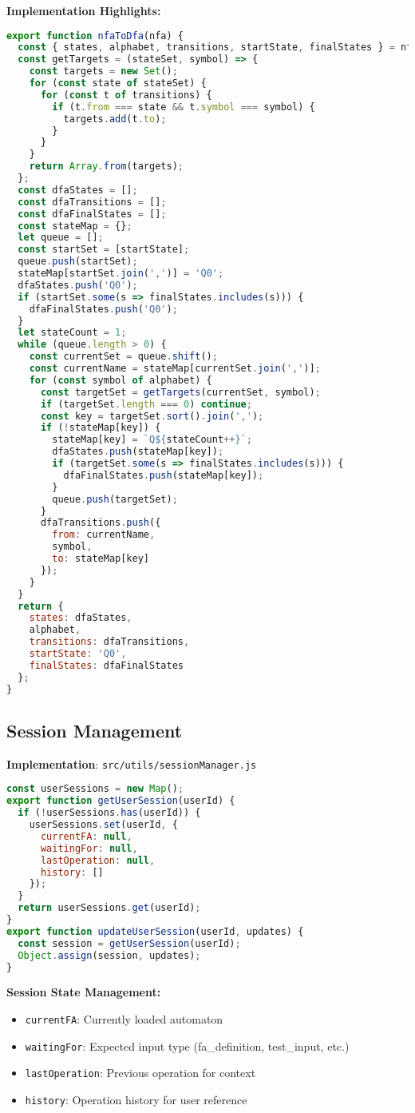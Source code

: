 \documentclass[12pt]{article}
\begin{document}
\textbf{Implementation Highlights:}
\begin{lstlisting}[language=JavaScript]
export function nfaToDfa(nfa) {
  const { states, alphabet, transitions, startState, finalStates } = nfa;
  const getTargets = (stateSet, symbol) => {
    const targets = new Set();
    for (const state of stateSet) {
      for (const t of transitions) {
        if (t.from === state && t.symbol === symbol) {
          targets.add(t.to);
        }
      }
    }
    return Array.from(targets);
  };
  const dfaStates = [];
  const dfaTransitions = [];
  const dfaFinalStates = [];
  const stateMap = {};
  let queue = [];
  const startSet = [startState];
  queue.push(startSet);
  stateMap[startSet.join(',')] = 'Q0';
  dfaStates.push('Q0');
  if (startSet.some(s => finalStates.includes(s))) {
    dfaFinalStates.push('Q0');
  }
  let stateCount = 1;
  while (queue.length > 0) {
    const currentSet = queue.shift();
    const currentName = stateMap[currentSet.join(',')];
    for (const symbol of alphabet) {
      const targetSet = getTargets(currentSet, symbol);
      if (targetSet.length === 0) continue;
      const key = targetSet.sort().join(',');
      if (!stateMap[key]) {
        stateMap[key] = `Q${stateCount++}`;
        dfaStates.push(stateMap[key]);
        if (targetSet.some(s => finalStates.includes(s))) {
          dfaFinalStates.push(stateMap[key]);
        }
        queue.push(targetSet);
      }
      dfaTransitions.push({ 
        from: currentName, 
        symbol, 
        to: stateMap[key] 
      });
    }
  }
  return {
    states: dfaStates,
    alphabet,
    transitions: dfaTransitions,
    startState: 'Q0',
    finalStates: dfaFinalStates
  };
}
\end{lstlisting}

\subsection{Session Management}
\textbf{Implementation}: \texttt{src/utils/sessionManager.js}
\begin{lstlisting}[language=JavaScript]
const userSessions = new Map();
export function getUserSession(userId) {
  if (!userSessions.has(userId)) {
    userSessions.set(userId, {
      currentFA: null,
      waitingFor: null,
      lastOperation: null,
      history: []
    });
  }
  return userSessions.get(userId);
}
export function updateUserSession(userId, updates) {
  const session = getUserSession(userId);
  Object.assign(session, updates);
}
\end{lstlisting}
\textbf{Session State Management:}
\begin{itemize}
    \item \texttt{currentFA}: Currently loaded automaton
    \item \texttt{waitingFor}: Expected input type (fa\_definition, test\_input, etc.)
    \item \texttt{lastOperation}: Previous operation for context
    \item \texttt{history}: Operation history for user reference
\end{itemize}
\end{document}
